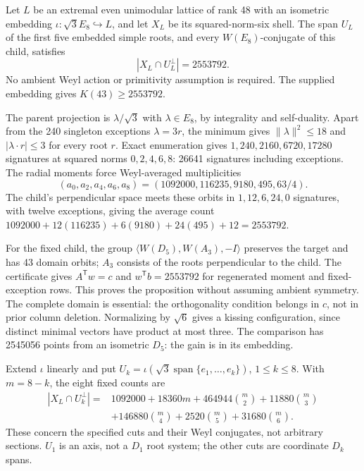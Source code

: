 \begin{proposition}\label{prop:section43}
Let $L$ be an extremal even unimodular lattice of rank 48 with an
isometric embedding $\iota:\sqrt3E_8\hookrightarrow L$, and let $X_L$
be its squared-norm-six shell. The span $U_L$ of the first five embedded
simple roots, and every $W(E_8)$-conjugate of this child, satisfies
\[
|X_L\cap U_L^\perp|=2553792.
\]
No ambient Weyl action or primitivity assumption is required.
The supplied embedding gives $K(43)\ge2553792$.
\end{proposition}

The parent projection is $\lambda/\sqrt3$ with $\lambda\in E_8$,
by integrality and self-duality. Apart from the 240 singleton
exceptions $\lambda=3r$, the minimum gives
$\|\lambda\|^2\le18$ and $|\lambda\cdot r|\le3$ for every root $r$.
Exact enumeration gives $1,240,2160,6720,17280$ signatures at squared
norms $0,2,4,6,8$: 26641 signatures including exceptions.
The radial moments force Weyl-averaged multiplicities
\[
(a_0,a_2,a_4,a_6,a_8)=(1092000,116235,9180,495,63/4).
\]
The child's perpendicular space meets these orbits in $1,12,6,24,0$
signatures, with twelve exceptions, giving the average count
$1092000+12(116235)+6(9180)+24(495)+12=2553792$.

For the fixed child, the group $\langle W(D_5),W(A_3),-I\rangle$
preserves the target and has 43 domain orbits; $A_3$ consists of the
roots perpendicular to the child. The certificate gives
$A^{\mathsf T}w=c$ and $w^{\mathsf T}b=2553792$ for regenerated
moment and fixed-exception rows. This proves the proposition without
assuming ambient symmetry. The complete domain is essential: the
orthogonality condition belongs in $c$, not in prior column deletion.
Normalizing by $\sqrt6$ gives a kissing configuration, since distinct
minimal vectors have product at most three. The comparison has
2545056 points from an isometric $D_5$: the gain is in its embedding.

Extend $\iota$ linearly and put
$U_k=\iota(\sqrt3\operatorname{span}\{e_1,\ldots,e_k\})$,
$1\le k\le8$. With $m=8-k$, the eight fixed counts are
\begin{align*}
|X_L\cap U_k^\perp|={}&1092000+18360m+464944\binom m2
+11880\binom m3\\
&+146880\binom m4+2520\binom m5+31680\binom m6.
\end{align*}
These concern the specified cuts and their Weyl conjugates, not
arbitrary sections. $U_1$ is an axis, not a $D_1$ root system;
the other cuts are coordinate $D_k$ spans.

